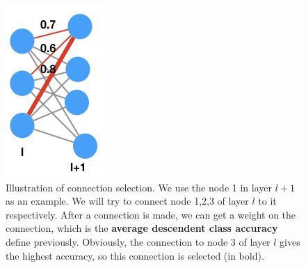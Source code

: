 \documentclass{acmtog} %
\begin{document}
\begin{figure}
\centering
\includegraphics[width=0.3\linewidth]{assets/method2.png}
\caption{Illustration of connection selection. We use the node 1 in layer $l+1$ as an example. We will try to connect node 1,2,3 of layer $l$ to it respectively. After a connection is made, we can get a weight on the connection, which is the \textbf{average descendent class accuracy} define previously. Obviously, the connection to node 3 of layer $l$ gives the highest accuracy, so this connection is selected (in bold).}
\label{fig:selection1}
\end{figure}

\begin{table}[t]
\label{tab:experiments}
\end{table}

\begin{table}
\label{tab:compression}
\end{table}
\end{document}
